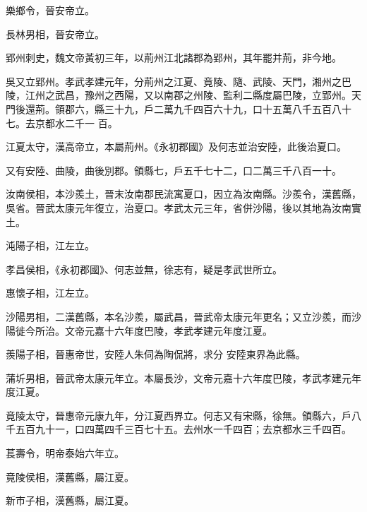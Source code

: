 \begin{pinyinscope}
 樂鄉令，晉安帝立。



 長林男相，晉安帝立。



 郢州刺史，魏文帝黃初三年，以荊州江北諸郡為郢州，其年罷并荊，非今地。



 吳又立郢州。孝武孝建元年，分荊州之江夏、竟陵、隨、武陵、天門，湘州之巴陵，江州之武昌，豫州之西陽，又以南郡之州陵、監利二縣度屬巴陵，立郢州。天門後還荊。領郡六，縣三十九，戶二萬九千四百六十九，口十五萬八千五百八十七。去京都水二千一
 百。



 江夏太守，漢高帝立，本屬荊州。《永初郡國》及何志並治安陸，此後治夏口。



 又有安陸、曲陵，曲後別郡。領縣七，戶五千七十二，口二萬三千八百一十。



 汝南侯相，本沙羨土，晉末汝南郡民流寓夏口，因立為汝南縣。沙羨令，漢舊縣，吳省。晉武太康元年復立，治夏口。孝武太元三年，省併沙陽，後以其地為汝南實土。



 沌陽子相，江左立。



 孝昌侯相，《永初郡國》、何志並無，徐志有，疑是孝武世所立。



 惠懷子相，江左立。



 沙陽男相，二漢舊縣，本名沙羨，屬武昌，晉武帝太康元年更名；又立沙羨，而沙陽徙今所治。文帝元嘉十六年度巴陵，孝武孝建元年度江夏。



 羨陽子相，晉惠帝世，安陸人朱伺為陶侃將，求分
 安陸東界為此縣。



 蒲圻男相，晉武帝太康元年立。本屬長沙，文帝元嘉十六年度巴陵，孝武孝建元年度江夏。



 竟陵太守，晉惠帝元康九年，分江夏西界立。何志又有宋縣，徐無。領縣六，戶八千五百九十一，口四萬四千三百七十五。去州水一千四百；去京都水三千四百。



 萇壽令，明帝泰始六年立。



 竟陵侯相，漢舊縣，屬江夏。



 新市子相，漢舊縣，屬江夏。




\end{pinyinscope}

